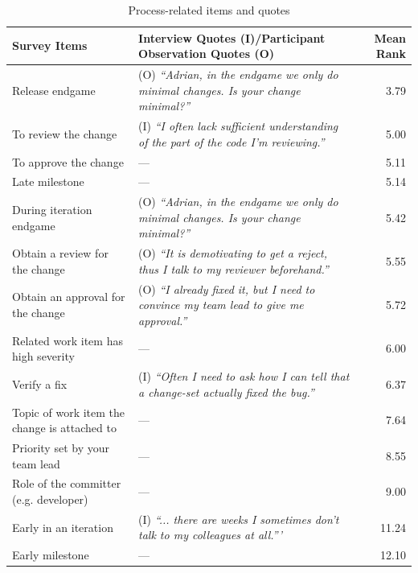 \begin{table}
\centering
\small
\centering
\begin{tabular}{l@{\hspace{7pt}}l@{\hspace{-20pt}}r}
\toprule
Survey Items & Interview Quotes (I)/Participant Observation Quotes (O) & Mean Rank\\
\midrule
Release endgame & (O) \emph{``Adrian, in the endgame we only do minimal changes. Is your change minimal?''}& 3.79\\%
To review the change &(I) \emph{``I often lack sufficient understanding of the part of the code I'm reviewing.''}& 5.00\\%
To approve the change &--- & 5.11\\%
Late milestone &--- & 5.14\\%
During iteration endgame &(O) \emph{``Adrian, in the endgame we only do minimal changes. Is your change minimal?''}& 5.42\\%
Obtain a review for the change &(O) \emph{``It is demotivating to get a reject, thus I talk to my reviewer beforehand.''}& 5.55\\%
Obtain an approval for the change &(O) \emph{``I already fixed it, but I  need to convince my team lead to give me approval.''}& 5.72\\%
Related work item has high severity &--- & 6.00\\%
Verify a fix &(I) \emph{``Often I need to ask how I can tell that a change-set actually fixed the bug.''}& 6.37\\%
Topic of work item the change is attached to &--- & 7.64\\%
Priority set by your team lead&--- & 8.55\\%
Role of the committer (e.g. developer) &--- & 9.00\\%
Early in an iteration &(I) \emph{``... there are weeks I sometimes don't talk to my colleagues at all.'''}& 11.24\\%
Early milestone &--- & 12.10\\%
\bottomrule
\end{tabular}
\label{tab:sub-process}
\caption{Process-related items and quotes}
\end{table}

